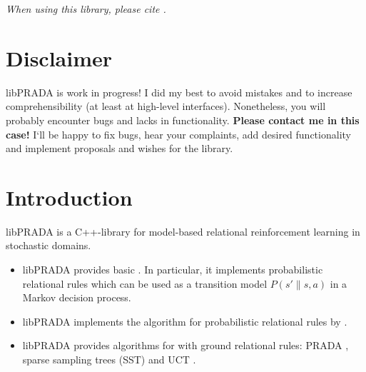 \documentclass[10pt,twoside,twocolumn,fleqn]{article}
\begin{document}
\maketitle

\begin{center}
\emph{When using this library, please cite \citet{lang-toussaint-10jair}.}
\end{center}

\tableofcontents





\section{Disclaimer}

libPRADA is work in progress! I did my best to avoid mistakes and to increase
comprehensibility (at least at high-level interfaces). Nonetheless, you
will probably encounter bugs and lacks in functionality. \textbf{Please contact
me in this case!} I`ll be happy to fix bugs, hear your complaints, add
desired functionality and implement proposals and wishes for the library.



\section{Introduction}

libPRADA is a C++-library for model-based relational reinforcement
learning in stochastic domains.
\begin{itemize}
\item libPRADA provides basic . In particular, it
implements probabilistic relational rules which can be used as a transition
model $P(s'\|s,a)$ in a Markov decision process.

\item libPRADA implements the algorithm for 
probabilistic relational rules by \citet{pasula07ai}.

\item libPRADA provides algorithms for  with ground
relational rules: PRADA \cite{lang-toussaint-10jair}, sparse sampling  trees
(SST) \cite{kearns02ss} and UCT \cite{kocsis06uct}.
\end{itemize}
\end{document}
